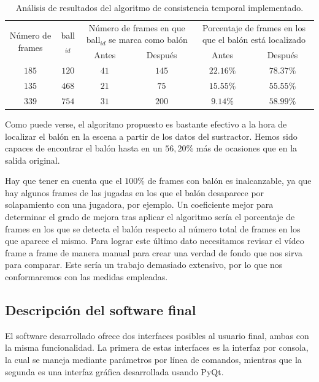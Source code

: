 \begin{table}
\centering
\begin{tabular}{|c|c|c|c|c|c|}
\hline
\multirow{2}{2cm}{Número de frames} & \multirow{2}{*}{ball$_{id}$} & \multicolumn{2}{m{4cm}|}{Número de frames en que ball$_{id}$ se marca como balón} & \multicolumn{2}{m{4cm}|}{Porcentaje de frames en los que el balón está localizado} \\ \cline{3-6}
& & \multicolumn{1}{m{2cm}|}{Antes} & \multicolumn{1}{m{2cm}|}{Después} & \multicolumn{1}{m{2cm}|}{Antes} & \multicolumn{1}{m{2cm}|}{Después} \\ \hline
 $185$ & $120$ & $41$ & $145$ & $22.16\%$ & $78.37\%$ \\ \hline
 $135$ & $468$ & $21$ & $75$ & $15.55\%$ & $55.55\%$ \\ \hline
 $339$ & $754$ & $31$ & $200$ & $9.14\%$ & $58.99\%$\\ \hline
\end{tabular}
\caption{Análisis de resultados del algoritmo de consistencia temporal implementado. }
\label{tab:3}
\end{table}

Como puede verse, el algoritmo propuesto es bastante efectivo a la hora de localizar el balón en la escena a partir de los datos del sustractor. Hemos sido capaces de encontrar el balón hasta en un $56,20\%$ más de ocasiones que en la salida original. 

Hay que tener en cuenta que el $100\%$ de frames con balón es inalcanzable, ya que hay algunos frames de las jugadas en los que el balón desaparece por solapamiento con una jugadora, por ejemplo. Un coeficiente mejor para determinar el grado de mejora tras aplicar el algoritmo sería el porcentaje de frames en los que se detecta el balón respecto al número total de frames en los que aparece el mismo. Para lograr este último dato necesitamos revisar el vídeo frame a frame de manera manual para crear una verdad de fondo que nos sirva para comparar. Este sería un trabajo demasiado extensivo, por lo que nos conformaremos con las medidas empleadas.


\subsection{Descripción del software final}

El software desarrollado ofrece dos interfaces posibles al usuario final, ambas con la misma funcionalidad. La primera de estas interfaces es la interfaz por consola, la cual se maneja mediante parámetros por línea de comandos, mientras que la segunda es una interfaz gráfica desarrollada usando PyQt.

